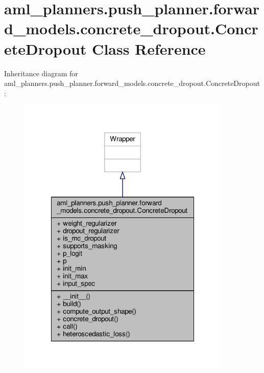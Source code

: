 \hypertarget{classaml__planners_1_1push__planner_1_1forward__models_1_1concrete__dropout_1_1_concrete_dropout}{\section{aml\-\_\-planners.\-push\-\_\-planner.\-forward\-\_\-models.\-concrete\-\_\-dropout.\-Concrete\-Dropout Class Reference}
\label{classaml__planners_1_1push__planner_1_1forward__models_1_1concrete__dropout_1_1_concrete_dropout}
}


Inheritance diagram for aml\-\_\-planners.\-push\-\_\-planner.\-forward\-\_\-models.\-concrete\-\_\-dropout.\-Concrete\-Dropout\-:
\nopagebreak
\begin{figure}[H]
\begin{center}
\leavevmode
\includegraphics[width=288pt]{classaml__planners_1_1push__planner_1_1forward__models_1_1concrete__dropout_1_1_concrete_dropout__inherit__graph}
\end{center}
\end{figure}


